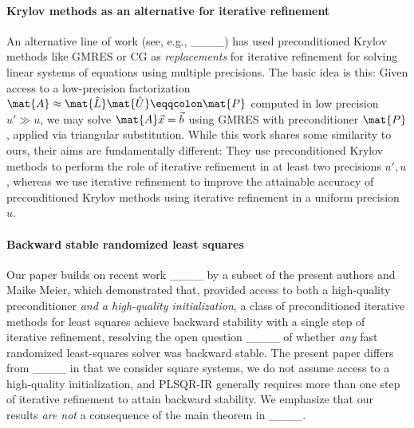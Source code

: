 \paragraph{Krylov methods as an alternative for iterative refinement}
An alternative line of work (see, e.g., ____) has used preconditioned Krylov methods like GMRES or CG as \emph{replacements} for iterative refinement for solving linear systems of equations using multiple precisions.
The basic idea is this:
Given access to a low-precision \LU factorization $\mat{A} \approx \mat{\hat{L}}\mat{\hat{U}} \eqqcolon \mat{P}$ computed in low precision $u' \gg u$, we may solve $\mat{A}\vec{x} = \vec{b}$ using GMRES with preconditioner $\mat{P}$, applied via triangular substitution.
While this work shares some similarity to ours, their aims are fundamentally different: They use preconditioned Krylov methods to perform the role of iterative refinement in at least two precisions $u', u$, whereas we use iterative refinement to improve the attainable accuracy of preconditioned Krylov methods using iterative refinement in a uniform precision $u$.

\paragraph{Backward stable randomized least squares}
Our paper builds on recent work ____ by a subset of the present authors and Maike Meier, which demonstrated that, provided access to both a high-quality preconditioner \emph{and a high-quality initialization}, a class of preconditioned iterative methods for least squares achieve backward stability with a single step of iterative refinement, resolving the open question ____ of whether \emph{any} fast randomized least-squares solver was backward stable.
The present paper differs from ____ in that we consider square systems, we do not assume access to a high-quality initialization, and PLSQR-IR generally requires more than one step of iterative refinement to attain backward stability.
We emphasize that our results \emph{are not} a consequence of the main theorem in ____.